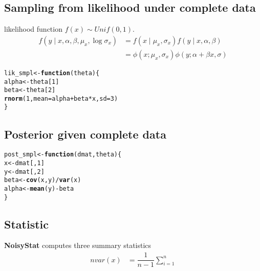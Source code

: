 \documentclass{article}\usepackage[]{graphicx}\usepackage[]{xcolor}
\makeatletter
\newcommand{\hlnum}[1]{\textcolor[rgb]{0.686,0.059,0.569}{#1}}%
\newcommand{\hlopt}[1]{\textcolor[rgb]{0,0,0}{#1}}%
\newcommand{\hlstd}[1]{\textcolor[rgb]{0.345,0.345,0.345}{#1}}%
\newcommand{\hlkwa}[1]{\textcolor[rgb]{0.161,0.373,0.58}{\textbf{#1}}}%
\newcommand{\hlkwb}[1]{\textcolor[rgb]{0.69,0.353,0.396}{#1}}%
\newcommand{\hlkwc}[1]{\textcolor[rgb]{0.333,0.667,0.333}{#1}}%
\newcommand{\hlkwd}[1]{\textcolor[rgb]{0.737,0.353,0.396}{\textbf{#1}}}%
\newenvironment{kframe}{%
 \def\at@end@of@kframe{}%
 \ifinner\ifhmode%
  \def\at@end@of@kframe{\end{minipage}}%
  \begin{minipage}{\columnwidth}%
 \fi\fi%
 \def\FrameCommand##1{\hskip\@totalleftmargin \hskip-\fboxsep
 \colorbox{shadecolor}{##1}\hskip-\fboxsep
     \hskip-\linewidth \hskip-\@totalleftmargin \hskip\columnwidth}%
 \MakeFramed {\advance\hsize-\width
   \@totalleftmargin\z@ \linewidth\hsize
   \@setminipage}}%
 {\par\unskip\endMakeFramed%
 \at@end@of@kframe}
\newenvironment{knitrout}{}{} %
\theoremstyle{definition}
\makeatother
\begin{document}
\subsection*{Sampling from likelihood under complete data}
likelihood function $f(x) \sim Unif(0,1)$.
\begin{align*}
f(y \mid x,  \alpha, \beta, \mu_x, \log \sigma_x) 
&= f(x \mid \mu_x, \sigma_x)f(y \mid x, \alpha, \beta)\\
&= \phi(x; \mu_x, \sigma_x)\phi(y; \alpha + \beta x, \sigma)
\end{align*}

\begin{knitrout}
\color{fgcolor}\begin{kframe}
\begin{alltt}
\hlstd{lik_smpl} \hlkwb{<-} \hlkwa{function}\hlstd{(}\hlkwc{theta}\hlstd{) \{}
  \hlstd{alpha} \hlkwb{<-} \hlstd{theta[}\hlnum{1}\hlstd{]}
  \hlstd{beta} \hlkwb{<-} \hlstd{theta[}\hlnum{2}\hlstd{]}
  \hlkwd{rnorm}\hlstd{(}\hlnum{1}\hlstd{,} \hlkwc{mean} \hlstd{= alpha} \hlopt{+} \hlstd{beta} \hlopt{*} \hlstd{x,} \hlkwc{sd} \hlstd{=} \hlnum{3}\hlstd{)}
\hlstd{\}}
\end{alltt}
\end{kframe}
\end{knitrout}

\subsection*{Posterior given complete data}
\begin{knitrout}
\color{fgcolor}\begin{kframe}
\begin{alltt}
\hlstd{post_smpl} \hlkwb{<-} \hlkwa{function}\hlstd{(}\hlkwc{dmat}\hlstd{,} \hlkwc{theta}\hlstd{) \{}
  \hlstd{x} \hlkwb{<-} \hlstd{dmat[,}\hlnum{1}\hlstd{]}
  \hlstd{y} \hlkwb{<-} \hlstd{dmat[,}\hlnum{2}\hlstd{]}
  \hlstd{beta} \hlkwb{<-}\hlkwd{cov}\hlstd{(x,y)}\hlopt{/}\hlkwd{var}\hlstd{(x)}
  \hlstd{alpha} \hlkwb{<-} \hlkwd{mean}\hlstd{(y)} \hlopt{-} \hlstd{beta}
\hlstd{\}}
\end{alltt}
\end{kframe}
\end{knitrout}

\subsection*{Statistic}
\textbf{NoisyStat} computes three summary statistics
\begin{align*}
nvar(x) &= \dfrac{1}{n-1}\sum_{i=1}^{n}
\end{align*}
\end{document}
